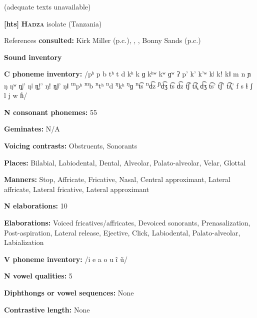 (adequate texts unavailable)



\textbf{[hts]}   \textbf{\textsc{Hadza}}  isolate (Tanzania)



References \textbf{consulted:} Kirk Miller (p.c.), \citet{Sands2013}, \citet{SandsEtAl2012}, Bonny Sands (p.c.)



\textbf{Sound inventory}



\textbf{C phoneme inventory:} /pʰ p b tʰ t d kʰ k ɡ kʰʷ kʷ ɡʷ ʔ p’ k’ k’ʷ kǀ kǃ kǁ m n ɲ ŋ ŋʷ ŋ̥ǀ’ ŋǀ ŋ̥ǃ’ ŋǃ ŋ̥ǁ’ ŋǁ \textsuperscript{m}pʰ \textsuperscript{m}b \textsuperscript{n}tʰ \textsuperscript{n}d \textsuperscript{ŋ}kʰ \textsuperscript{ŋ}ɡ \textsuperscript{n}t͡s \textsuperscript{n}d͡z \textsuperscript{ɲ}d͡ʒ t͡s d͡z t͡ʃ t͡ʎ̥ d͡ʒ t͡s’ t͡ʃ’ t͡ʎ̥’ f s ɬ ʃ l j w ɦ/



\textbf{N consonant phonemes:} 55



\textbf{Geminates:} N/A



\textbf{Voicing contrasts:} Obstruents, Sonorants



\textbf{Places:} Bilabial, Labiodental, Dental, Alveolar, Palato-alveolar, Velar, Glottal



\textbf{Manners:} Stop, Affricate, Fricative, Nasal, Central approximant, Lateral affricate, Lateral fricative, Lateral approximant



\textbf{N elaborations:} 10



\textbf{Elaborations:} Voiced fricatives/affricates, Devoiced sonorants, Prenasalization, Post-aspiration, Lateral release, Ejective, Click, Labiodental, Palato-alveolar, Labialization



\textbf{V phoneme inventory:} /i e a o u ĩ ũ/



\textbf{N vowel qualities:} 5



\textbf{Diphthongs or vowel sequences:} None



\textbf{Contrastive length:} None



